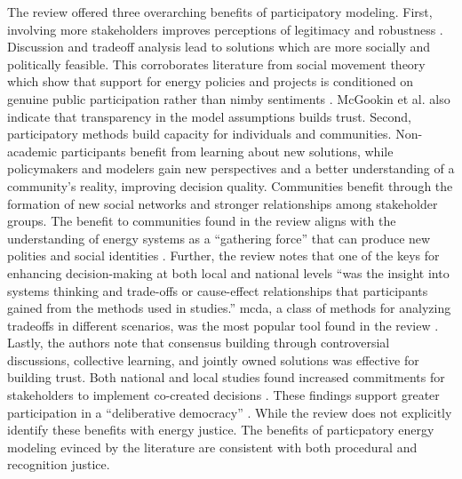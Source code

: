 The review offered three overarching benefits of participatory modeling. First,
involving more stakeholders improves perceptions of legitimacy and robustness
\cite{mcgookin_participatory_2021}. Discussion and tradeoff analysis lead to
solutions which are more socially and politically feasible. This corroborates
literature from social movement theory which show that support for energy
policies and projects is conditioned on genuine public participation rather than
\ac{nimby} sentiments \cite{summers_influencing_2020,ottinger_procedural_2014,
walker_procedural_2017,barragan-contreras_procedural_2022,gonyo_resident_2021,konisky_proximity_2021}.
McGookin et al. also indicate that transparency in the model assumptions builds
trust. Second, participatory methods build capacity for individuals and
communities. Non-academic participants benefit from learning about new
solutions, while policymakers and modelers gain new perspectives and a better
understanding of a community's reality, improving decision quality. Communities
benefit through the formation of new social networks and stronger relationships
among stakeholder groups. The benefit to communities found in the review aligns
with the understanding of energy systems as a ``gathering force'' that can
produce new polities and social identities \cite{bridge_energy_2018}. Further,
the review notes that one of the keys for enhancing decision-making at both
local and national levels ``was the insight into systems thinking and trade-offs
or cause-effect relationships that participants gained from the methods used in
studies.'' \Ac{mcda}, a class of methods for analyzing tradeoffs in different
scenarios, was the most popular tool found in the review
\cite{mcgookin_participatory_2021}. Lastly, the authors note that consensus
building through controversial discussions, collective learning, and jointly
owned solutions was effective for building trust. Both national and local
studies found increased commitments for stakeholders to implement co-created
decisions \cite{mcgookin_participatory_2021}. These findings support greater
participation in a ``deliberative democracy'' \cite{dryzek_deliberative_2013}.
While the review does not explicitly identify these benefits with energy
justice. The benefits of particpatory energy modeling evinced by the literature
are consistent with both procedural and recognition justice.



